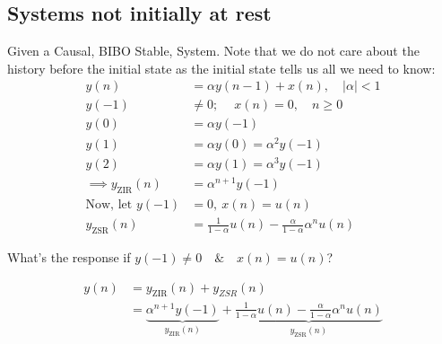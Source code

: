 \subsection{Systems not initially at rest}
Given a Causal, BIBO Stable, System. Note that we do not care about the history before the initial state as the initial state tells us all we need to know:
\begin{align*}
    y(n)
    &= \alpha y(n-1)+x(n),\quad|\alpha|<1
    \\
    y(-1)
    &\neq 0;\quad \ x(n)=0,\quad n\ge0
    \\
    y(0)
    &=\alpha y(-1)
    \\
    y(1)
    &=\alpha y(0)=\alpha^2 y(-1)
    \\
    y(2)
    &=\alpha y(1)=\alpha^3 y(-1)
    \\
    \implies
    y_{\text{ZIR}}(n)
    &=\alpha^{n+1} y(-1)
    \\
    \text{Now, let } y(-1)
    &=0,\ x(n)=u(n)
    \\
    y_{\text{ZSR}}(n)
    &=
    {\frac{1}{1-\alpha}u(n)} - {\frac{\alpha}{1-\alpha}\alpha^n u(n)}
\end{align*}
\begin{shaded}
What's the response if $y(-1)\neq0\quad\&\quad x(n)=u(n)$?
\end{shaded}
\begin{align*}
    y(n)
    &= y_{\text{ZIR}}(n) + y_{ZSR}(n)
    \\
    &= \underbrace{\alpha^{n+1}y(-1)}_{y_{\text{ZIR}}(n)}
    + \underbrace{\frac{1}{1-\alpha}u(n) - \frac{\alpha}{1-\alpha}\alpha^n u(n)}_{y_{\text{ZSR}}(n)}
\end{align*}
\hrulefill
